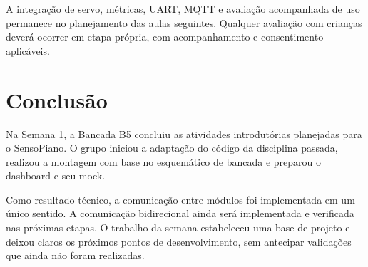 \documentclass[11pt,a4paper]{article}
\begin{document}
A integração de servo, métricas, UART, MQTT e avaliação acompanhada de uso permanece no planejamento das aulas seguintes. Qualquer avaliação com crianças deverá ocorrer em etapa própria, com acompanhamento e consentimento aplicáveis.

\section{Conclusão}

Na Semana 1, a Bancada B5 concluiu as atividades introdutórias planejadas para o SensoPiano. O grupo iniciou a adaptação do código da disciplina passada, realizou a montagem com base no esquemático de bancada e preparou o dashboard e seu mock.

Como resultado técnico, a comunicação entre módulos foi implementada em um único sentido. A comunicação bidirecional ainda será implementada e verificada nas próximas etapas. O trabalho da semana estabeleceu uma base de projeto e deixou claros os próximos pontos de desenvolvimento, sem antecipar validações que ainda não foram realizadas.
\end{document}
